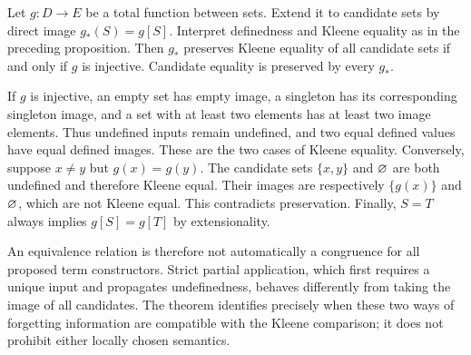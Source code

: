 \begin{theorem}
Let $g:D\to E$ be a total function between sets. Extend it to candidate
sets by direct image $g_*(S)=g[S]$. Interpret definedness and Kleene
equality as in the preceding proposition. Then $g_*$ preserves Kleene
equality of all candidate sets if and only if $g$ is injective.
Candidate equality is preserved by every $g_*$.
\end{theorem}
\Proof
If $g$ is injective, an empty set has empty image, a singleton has its
corresponding singleton image, and a set with at least two elements has
at least two image elements. Thus undefined inputs remain undefined,
and two equal defined values have equal defined images. These are the
two cases of Kleene equality.
Conversely, suppose $x\ne y$ but $g(x)=g(y)$. The candidate sets
$\{x,y\}$ and $\varnothing$ are both undefined and therefore Kleene
equal. Their images are respectively $\{g(x)\}$ and $\varnothing$,
which are not Kleene equal. This contradicts preservation. Finally,
$S=T$ always implies $g[S]=g[T]$ by extensionality.
\Done

An equivalence relation is therefore not automatically a congruence for
all proposed term constructors. Strict partial application, which first
requires a unique input and propagates undefinedness, behaves differently
from taking the image of all candidates. The theorem identifies precisely
when these two ways of forgetting information are compatible with the
Kleene comparison; it does not prohibit either locally chosen semantics.

